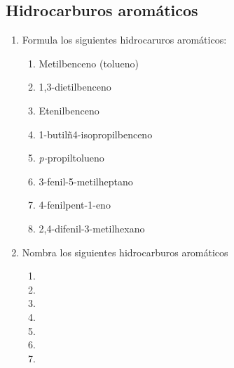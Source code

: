 \subsection*{Hidrocarburos aromáticos}
\begin{enumerate}
    \item Formula los siguientes hidrocaruros aromáticos:
          \begin{enumerate}
              \item Metilbenceno (tolueno)
              \item 1,3-dietilbenceno
              \item Etenilbenceno
              \item 1-butilñ4-isopropilbenceno
              \item \textit{p-}propiltolueno
              \item 3-fenil-5-metilheptano
              \item 4-fenilpent-1-eno
              \item 2,4-difenil-3-metilhexano
          \end{enumerate}
    \item Nombra los siguientes hidrocarburos aromáticos
          \begin{enumerate}
              \item {}
              \item {}
              \item {}
              \item {}
              \item {}
              \item {}
              \item {}
          \end{enumerate}
\end{enumerate}
